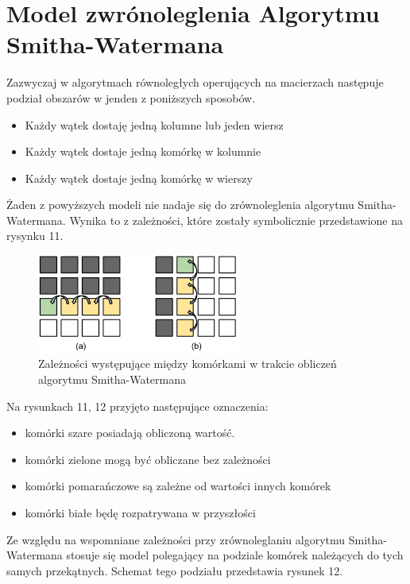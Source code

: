 \documentclass[a4paper,12pt]{article}
\newenvironment{lista}{
\begin{itemize}
  \setlength{\itemsep}{1pt}
  \setlength{\parskip}{0pt}
  \setlength{\parsep}{0pt}
}{\end{itemize}}
\begin{document}
\section*{Model zwrónoleglenia Algorytmu Smitha-Watermana}
Zazwyczaj w algorytmach równoległych operujących na macierzach następuje podział obszarów w jenden z poniższych sposobów. 
\begin{lista}
\item Każdy wątek dostaję jedną kolumne lub jeden wiersz
\item Każdy wątek dostaje jedną komórkę w kolumnie
\item Każdy wątek dostaje jedną komórkę w wierszy
\end{lista}

Żaden z powyższych modeli nie nadaje się do zrównoleglenia algorytmu Smitha-Watermana. Wynika to z zależności, które zostały symbolicznie przedstawione na rysynku 11.

\begin{figure}[H]
  \vspace{5pt}
  \centering
  \begin{center}
  \includegraphics[width=0.6\textwidth]{images/ZleModeleZrownoleglenia.png}
  \end{center}
  \caption{Zależności występujące między komórkami w trakcie obliczeń algorytmu Smitha-Watermana}
 \end{figure}


Na rysunkach 11, 12 przyjęto następujące oznaczenia: 
\begin{lista}
\item komórki szare posiadają obliczoną wartość.
\item komórki zielone mogą być obliczane bez zależności
\item komórki pomarańczowe są zależne od wartości innych komórek
\item komórki białe będę rozpatrywana w przyszłości
\end{lista} 

Ze względu na wspomniane zależności przy zrównoleglaniu algorytmu Smitha-Watermana stosuje się model polegający na podziale komórek należących do tych samych przekątnych. Schemat tego podziału przedstawia rysunek 12.
\end{document}
